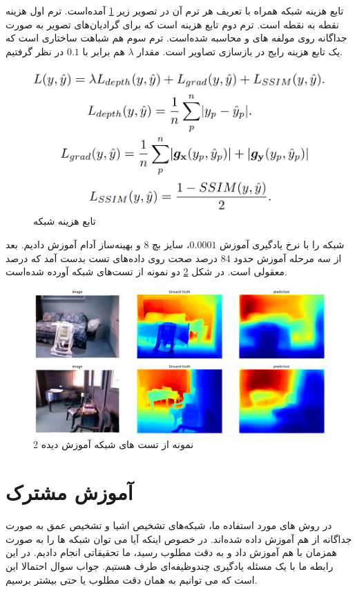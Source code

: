 \documentclass[12pt,a4paper]{report}
\begin{document}
تابع هزینه شبکه همراه با تعریف هر ترم آن در تصویر زیر \ref{unet_loss} آمده‌است.
ترم اول هزینه  نقطه به نقطه است.
ترم دوم تابع هزینه  است که برای گرادیان‌های تصویر به صورت جداگانه روی مولفه های  و 
محاسبه شده‌است.
ترم سوم هم شباهت ساختاری است که یک تابع هزینه رایج در بازسازی تصاویر است.
مقدار $\lambda$ هم برابر با $0.1$ در نظر گرفتیم.
\begin{figure}
  \centering
  \includegraphics[width=.7\textwidth]{Images//unet6.png}
  \caption{تابع هزینه شبکه }\label{unet_loss}
\end{figure}

شبکه را با نرخ یادگیری آموزش $0.0001$، سایز بچ 8 و بهینه‌ساز آدام آموزش دادیم.
بعد از سه مرحله آموزش حدود 84 درصد صحت روی داده‌های تست بدست آمد که درصد معقولی است.
در شکل \ref{unet_test} دو نمونه از تست‌های شبکه آورده شده‌است.
\begin{figure}
  \centering
  \includegraphics[width=\textwidth]{Images//unet7.png}
  \caption{2 نمونه از تست های شبکه آموزش دیده}\label{unet_test}
\end{figure}

\chapter{آموزش مشترک}
در روش های مورد استفاده ما، شبکه‌های تشخیص اشیا و تشخیص عمق به صورت جداگانه از هم آموزش داده شده‌اند.
در خصوص اینکه آیا می توان شبکه ها را به صورت همزمان با هم آموزش داد و به دقت مطلوب رسید،
ما تحقیقاتی انجام دادیم.
در این رابطه ما با یک مسئله یادگیری چندوظیفه‌ای
طرف هستیم.
جواب سوال احتمالا این است که می توانیم به همان دقت مطلوب یا حتی بیشتر برسیم.
\end{document}
